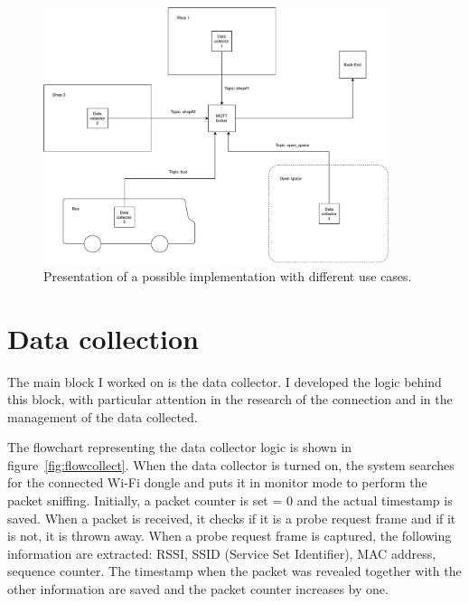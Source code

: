 \begin{figure}[h]
\centering 
\includegraphics[width=0.9\textwidth]{images/excases} 
\caption{Presentation of a possible implementation with different use cases.}
\label{fig:excases}
\end{figure}


\section{Data collection}
\label{sec:collection}
\vspace{0.2 cm} 

The main block I worked on is the data collector. I developed the logic behind this block, with particular attention in the research of the connection and in the management of the data collected.

The flowchart representing the data collector logic is shown in figure~\ref{fig:flowcollect}. When the data collector is turned on, the system searches for the connected Wi-Fi dongle and puts it in monitor mode to perform the packet sniffing. Initially, a packet counter is set = 0 and the actual timestamp is saved. When a packet is received, it checks if it is a probe request frame and if it is not, it is thrown away.
When a probe request frame is captured, the following information are extracted: RSSI, SSID (Service Set Identifier), MAC address, sequence counter. The timestamp when the packet was revealed together with the other information are saved and the packet counter increases by one.

